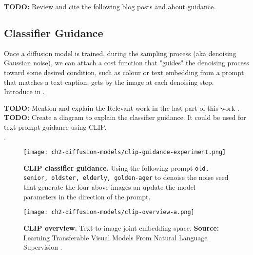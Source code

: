     \textbf{TODO:} Review and cite the following \href{https://sander.ai/2023/08/28/geometry.html}{blog posts} \cite{dieleman2022guidance} and \cite{dieleman2023geometry} about guidance.

\subsection{Classifier Guidance}

    Once a diffusion model is trained, during the sampling
    process (aka denoising Gaussian noise), we can attach
    a cost function that "guides" the denoising process toward
    some desired condition, such as colour or text embedding from a prompt that matches a text caption, gets by the image at each denoising step.\\ Introduce in \cite{nichol2021glide}.

    \textbf{TODO:} Mention and explain the Relevant work in the last part of this work \cite{Dhariwal2021DiffusionMB}.\\     

    \textbf{TODO:} Create a diagram to explain the classifier guidance. It could be used for text prompt guidance using CLIP.\\ .

\begin{figure}[ht]
    \centering
    \texttt{[image: ch2-diffusion-models/clip-guidance-experiment.png]}
    \captionsetup{width=\textwidth} %
    \caption{\textbf{CLIP classifier guidance.} Using the following prompt \texttt{old, senior, oldster, elderly, golden-ager} to denoise the noise seed that generate the four above images an update the model parameters in
    the direction of the prompt.}
    \label{fig:clip-guidance-old-experiment}
  \end{figure}

\begin{figure}[ht]
    \centering
    \texttt{[image: ch2-diffusion-models/clip-overview-a.png]}
    \captionsetup{width=\textwidth} %
    \caption{\textbf{CLIP overview.} Text-to-image joint embedding space. \textbf{Source:} Learning Transferable Visual Models From Natural Language Supervision \citep{radford2021learning}.}
    \label{fig:clip-overview}
  \end{figure}

